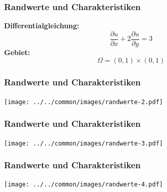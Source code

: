 \begin{frame}
\frametitle{Randwerte und Charakteristiken}

{\bf Differentialgleichung:}
\[
\frac{\partial u}{\partial x}
+
2\frac{\partial u}{\partial y}
= 3
\]
{\bf Gebiet:}
\[
\Omega = (0,1)\times(0,1)
\]
\end{frame}

\begin{frame}
\frametitle{Randwerte und Charakteristiken}
\begin{center}
\texttt{[image: ../../common/images/randwerte-2.pdf]}
\end{center}
\end{frame}

\begin{frame}
\frametitle{Randwerte und Charakteristiken}
\begin{center}
\texttt{[image: ../../common/images/randwerte-3.pdf]}
\end{center}
\end{frame}

\begin{frame}
\frametitle{Randwerte und Charakteristiken}
\begin{center}
\texttt{[image: ../../common/images/randwerte-4.pdf]}
\end{center}
\end{frame}

